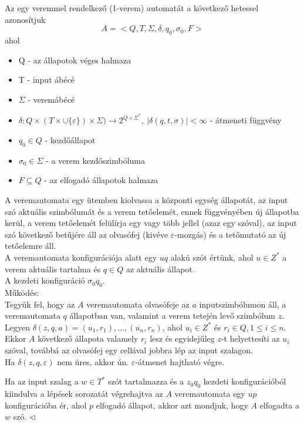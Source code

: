 \documentclass[12pt,margin=0px]{article}
\begin{document}
    Az egy veremmel rendelkező (1-verem) automatát a következő hetessel azonosítjuk
    \[
        A = \Big<Q, T, \Sigma, \delta, q_0, \sigma_0, F\Big>
    \]
    ahol
    \begin{itemize}
        \item Q - az állapotok véges halmaza
        \item T - input ábécé
        \item $\Sigma$ - veremábécé
        \item $\delta : Q \times (T \times \cup \{\varepsilon\}) \times \Sigma) \rightarrow 2^{Q \times \Sigma^{*}},\ |\delta(q,t,\sigma)| < \infty$ - átmeneti függvény
        \item $q_0 \in Q $ - kezdőállapot
        \item $\sigma_{0} \in \Sigma $ - a verem kezdőszimbóluma
        \item $F \subseteq Q$ - az elfogadó állapotok halmaza
    \end{itemize}

    {\footnotesize \noindent {\color{blue} \faLightbulbO\ $\triangleright$ } }
    {\footnotesize
    \noindent A veremautomata egy ütemben kiolvassa a központi egység állapotát, az input szó aktuális szimbólumát és a verem tetőelemét, ennek függvényében új állapotba kerül, a verem tetőelemét felülírja egy vagy több jellel (azaz egy szóval), az input szó következő betűjére áll az olvasófej (kivéve $\varepsilon$-mozgás) és a tetőmutató az új tetőelemre áll.\\

    \noindent A veremautomata konfigurációja alatt egy $uq$ alakú szót értünk, ahol $u \in Z^*$ a verem aktuális tartalma és $q \in Q$ az aktuális állapot. \\
    \noindent A kezdeti konfiguráció $\sigma_0q_0$.\\
							
    \noindent Működés: \\

    \noindent Tegyük fel, hogy az $A$ veremautomata olvasófeje az $a$ inputszimbólumon áll, a veremautomata $q$ állapotban van, valamint a verem tetején levő szimbólum $z$. Legyen $ \delta(z, q, a) = {(u_1, r_1), . . . , (u_n, r_n)}$, ahol $u_i \in Z^*$ és $r_i \in Q, 1 \leq i \leq n$. Ekkor $A$ következő állapota valamely $r_i$ lesz és egyidejűleg $z$-t helyettesíti az $u_i$ szóval, továbbá az olvasófej egy cellával jobbra lép az input szalagon.\\
    Ha $\delta(z, q, \varepsilon)$ nem üres, akkor ún. $\varepsilon$-átmenet hajtható végre.
							
    \noindent Ha az input szalag a $w \in T^*$ szót tartalmazza és a $z_0q_0$ kezdeti konfigurációból kiindulva a lépések sorozatát végrehajtva az $A$ veremautomata egy $up$ konfigurációba ér, ahol $p$ elfogadó állapot, akkor azt mondjuk, hogy $A$ elfogadta a $w$ szó.
    $\triangleleft$ \faLightbulbO}\\
\end{document}
